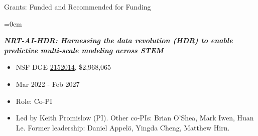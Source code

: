 \documentclass{resume} %
\begin{document}
\begin{rSection}{Grants: Funded and Recommended for Funding}
\begin{itemize}{}{\leftmargin=0em}
\end{itemize}

\textbf{\textit{NRT-AI-HDR: Harnessing the data revolution (HDR) to enable
predictive multi-scale modeling across STEM }}
\vspace{-.1in}
\begin{itemize}{}{\leftmargin=0em}
   \itemsep -0.6em %
   \item NSF DGE-\href{https://nsf.gov/awardsearch/showAward?AWD_ID=2152014}{2152014}, \$2,968,065
\item
Mar 2022 - Feb 2027
   \item
Role: Co-PI
\item Led by Keith Promislow (PI). Other co-PIs: Brian O'Shea, Mark Iwen, Huan Le. Former leadership: Daniel Appel\"o, Yingda Cheng, Matthew Hirn.

\end{itemize}



\end{rSection}
\end{document}
